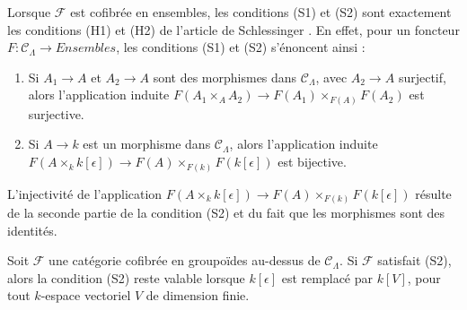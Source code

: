 \begin{remark}
\label{remark-compare-S1-S2-schlessinger}
Lorsque $\mathcal{F}$ est cofibrée en ensembles, les conditions (S1) et (S2)
sont exactement les conditions (H1) et (H2) de l'article de Schlessinger
\cite{Sch}. En effet, pour un foncteur $F: \mathcal{C}_\Lambda \to
\textit{Ensembles}$, les conditions (S1) et (S2) s'énoncent ainsi :
\begin{enumerate}
\item [(S1)] Si $A_1 \to A$ et $A_2 \to A$ sont des morphismes dans
$\mathcal{C}_\Lambda$, avec $A_2 \to A$ surjectif, alors l'application
induite $F(A_1 \times_A A_2) \to F(A_1) \times_{F(A)} F(A_2)$ est surjective.
\item [(S2)] Si $A \to k$ est un morphisme dans $\mathcal{C}_\Lambda$,
alors l'application induite
$F(A \times_k k[\epsilon]) \to F(A) \times_{F(k)} F(k[\epsilon])$
est bijective.
\end{enumerate}
L'injectivité de l'application
$F(A \times_k k[\epsilon]) \to F(A) \times_{F(k)} F(k[\epsilon])$
résulte de la seconde partie de la condition (S2) et du fait que les
morphismes sont des identités.
\end{remark}

\begin{lemma}
\label{lemma-S2-extensions}
Soit $\mathcal{F}$ une catégorie cofibrée en groupoïdes au-dessus de
$\mathcal{C}_\Lambda$. Si $\mathcal{F}$ satisfait (S2), alors la condition
(S2) reste valable lorsque $k[\epsilon]$ est remplacé par $k[V]$, pour tout
$k$-espace vectoriel $V$ de dimension finie.
\end{lemma}

